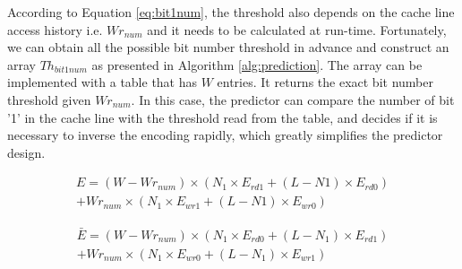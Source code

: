 According to Equation \ref{eq:bit1num}, the threshold also depends on 
the cache line access history i.e. $Wr_{num}$ and it needs to be calculated at run-time.
Fortunately, we can obtain all the possible bit number threshold in advance 
and construct an array $Th_{bit1num}$ as presented in Algorithm \ref{alg:prediction}. 
The array can be implemented with a table that has $W$ entries. 
It returns the exact bit number threshold given $Wr_{num}$. In this case, the predictor 
can compare the number of bit '1' in the cache line with the threshold read from the 
table, and decides if it is necessary to inverse the encoding rapidly, which greatly 
simplifies the predictor design. 

\footnotesize
\begin{equation}
    \label{eq:energy-efficiency}
    \begin{split}
        E=(W-Wr_{num}) \times (N_{1} \times E_{rd1} + (L - N1) \times E_{rd0})\\
        + Wr_{num} \times (N_{1} \times E_{wr1} + (L - N1) \times E_{wr0})
    \end{split}
\end{equation}

\begin{equation}
    \label{eq:_energy-efficiency}
    \begin{split}
        \bar{E}=(W-Wr_{num}) \times (N_{1} \times E_{rd0} + (L - N_{1}) \times E_{rd1}) \\ 
        + Wr_{num} \times (N_{1} \times E_{wr0} + (L - N_{1}) \times E_{wr1})
    \end{split}
\end{equation}



